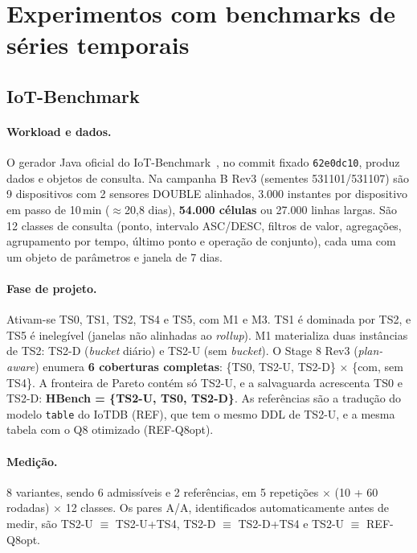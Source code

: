 \documentclass[10pt,a4paper,twoside]{article}
\theoremstyle{definition}\newtheorem{definicao}{Definição}
\begin{document}
\section{Experimentos com benchmarks de séries temporais}\label{sec:tsdb}
\subsection{IoT-Benchmark}
\paragraph{Workload e dados.} O gerador Java oficial do IoT-Benchmark~\cite{iotbench}, no commit fixado \texttt{62e0dc10}, produz dados e objetos de consulta. Na campanha B Rev3 (sementes 531101/531107) são 9 dispositivos com 2 sensores DOUBLE alinhados, 3.000 instantes por dispositivo em passo de 10\,min ($\approx$20,8 dias), \textbf{54.000 células} ou 27.000 linhas largas. São 12 classes de consulta (ponto, intervalo ASC/DESC, filtros de valor, agregações, agrupamento por tempo, último ponto e operação de conjunto), cada uma com um objeto de parâmetros e janela de 7 dias.

\paragraph{Fase de projeto.} Ativam-se TS0, TS1, TS2, TS4 e TS5, com M1 e M3. TS1 é dominada por TS2, e TS5 é inelegível (janelas não alinhadas ao \emph{rollup}). M1 materializa duas instâncias de TS2: TS2-D (\emph{bucket} diário) e TS2-U (sem \emph{bucket}). O Stage 8 Rev3 (\emph{plan-aware}) enumera \textbf{6 coberturas completas}: \{TS0, TS2-U, TS2-D\} $\times$ \{com, sem TS4\}. A fronteira de Pareto contém só TS2-U, e a salvaguarda acrescenta TS0 e TS2-D: \textbf{HBench = \{TS2-U, TS0, TS2-D\}}. As referências são a tradução do modelo \texttt{table} do IoTDB (REF), que tem o mesmo DDL de TS2-U, e a mesma tabela com o Q8 otimizado (REF-Q8opt).

\paragraph{Medição.} 8 variantes, sendo 6 admissíveis e 2 referências, em 5 repetições $\times$ (10 + 60 rodadas) $\times$ 12 classes. Os pares A/A, identificados automaticamente antes de medir, são TS2-U $\equiv$ TS2-U+TS4, TS2-D $\equiv$ TS2-D+TS4 e TS2-U $\equiv$ REF-Q8opt.
\end{document}
